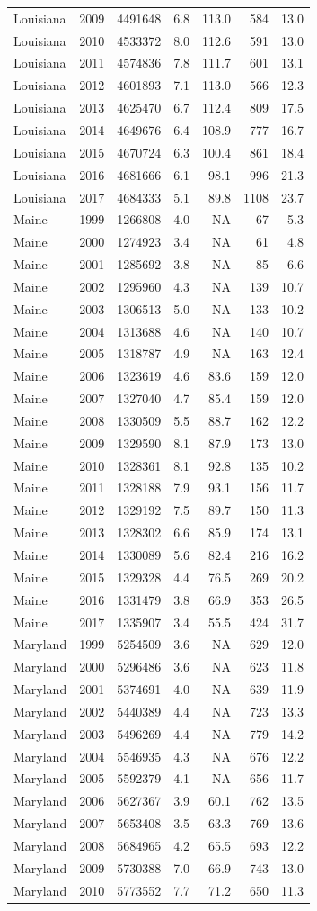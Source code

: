 \documentclass[
]{article}
\begin{document}
\begin{longtable}[]{@{}lrrrrrr@{}}
Louisiana & 2009 & 4491648 & 6.8 & 113.0 & 584 & 13.0\tabularnewline
Louisiana & 2010 & 4533372 & 8.0 & 112.6 & 591 & 13.0\tabularnewline
Louisiana & 2011 & 4574836 & 7.8 & 111.7 & 601 & 13.1\tabularnewline
Louisiana & 2012 & 4601893 & 7.1 & 113.0 & 566 & 12.3\tabularnewline
Louisiana & 2013 & 4625470 & 6.7 & 112.4 & 809 & 17.5\tabularnewline
Louisiana & 2014 & 4649676 & 6.4 & 108.9 & 777 & 16.7\tabularnewline
Louisiana & 2015 & 4670724 & 6.3 & 100.4 & 861 & 18.4\tabularnewline
Louisiana & 2016 & 4681666 & 6.1 & 98.1 & 996 & 21.3\tabularnewline
Louisiana & 2017 & 4684333 & 5.1 & 89.8 & 1108 & 23.7\tabularnewline
Maine & 1999 & 1266808 & 4.0 & NA & 67 & 5.3\tabularnewline
Maine & 2000 & 1274923 & 3.4 & NA & 61 & 4.8\tabularnewline
Maine & 2001 & 1285692 & 3.8 & NA & 85 & 6.6\tabularnewline
Maine & 2002 & 1295960 & 4.3 & NA & 139 & 10.7\tabularnewline
Maine & 2003 & 1306513 & 5.0 & NA & 133 & 10.2\tabularnewline
Maine & 2004 & 1313688 & 4.6 & NA & 140 & 10.7\tabularnewline
Maine & 2005 & 1318787 & 4.9 & NA & 163 & 12.4\tabularnewline
Maine & 2006 & 1323619 & 4.6 & 83.6 & 159 & 12.0\tabularnewline
Maine & 2007 & 1327040 & 4.7 & 85.4 & 159 & 12.0\tabularnewline
Maine & 2008 & 1330509 & 5.5 & 88.7 & 162 & 12.2\tabularnewline
Maine & 2009 & 1329590 & 8.1 & 87.9 & 173 & 13.0\tabularnewline
Maine & 2010 & 1328361 & 8.1 & 92.8 & 135 & 10.2\tabularnewline
Maine & 2011 & 1328188 & 7.9 & 93.1 & 156 & 11.7\tabularnewline
Maine & 2012 & 1329192 & 7.5 & 89.7 & 150 & 11.3\tabularnewline
Maine & 2013 & 1328302 & 6.6 & 85.9 & 174 & 13.1\tabularnewline
Maine & 2014 & 1330089 & 5.6 & 82.4 & 216 & 16.2\tabularnewline
Maine & 2015 & 1329328 & 4.4 & 76.5 & 269 & 20.2\tabularnewline
Maine & 2016 & 1331479 & 3.8 & 66.9 & 353 & 26.5\tabularnewline
Maine & 2017 & 1335907 & 3.4 & 55.5 & 424 & 31.7\tabularnewline
Maryland & 1999 & 5254509 & 3.6 & NA & 629 & 12.0\tabularnewline
Maryland & 2000 & 5296486 & 3.6 & NA & 623 & 11.8\tabularnewline
Maryland & 2001 & 5374691 & 4.0 & NA & 639 & 11.9\tabularnewline
Maryland & 2002 & 5440389 & 4.4 & NA & 723 & 13.3\tabularnewline
Maryland & 2003 & 5496269 & 4.4 & NA & 779 & 14.2\tabularnewline
Maryland & 2004 & 5546935 & 4.3 & NA & 676 & 12.2\tabularnewline
Maryland & 2005 & 5592379 & 4.1 & NA & 656 & 11.7\tabularnewline
Maryland & 2006 & 5627367 & 3.9 & 60.1 & 762 & 13.5\tabularnewline
Maryland & 2007 & 5653408 & 3.5 & 63.3 & 769 & 13.6\tabularnewline
Maryland & 2008 & 5684965 & 4.2 & 65.5 & 693 & 12.2\tabularnewline
Maryland & 2009 & 5730388 & 7.0 & 66.9 & 743 & 13.0\tabularnewline
Maryland & 2010 & 5773552 & 7.7 & 71.2 & 650 & 11.3\tabularnewline

\end{longtable}
\end{document}
